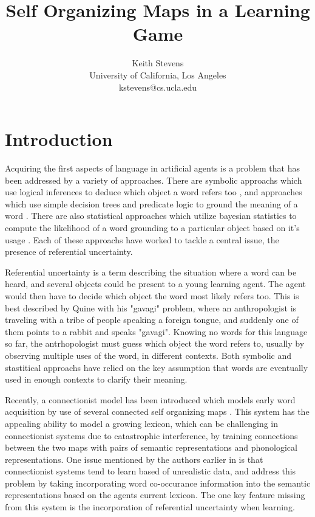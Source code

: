 \documentclass[a4paper,11pt]{article}
\title{Self Organizing Maps in a Learning Game}
\author{Keith Stevens \\ University of California, Los Angeles \\
kstevens@cs.ucla.edu}
\date{}
\begin{document}
\maketitle

\section{Introduction}
Acquiring the first aspects of language in artificial agents is a problem that
has been addressed by a variety of approaches.  There are symbolic approachs
which use logical inferences to deduce which object a word refers too
\cite{Siskind}, and approaches which use simple decision trees and predicate
logic to ground the meaning of a word \cite{GoldNico}.  There are also
statistical approaches which utilize bayesian statistics to compute the
likelihood of a word grounding to a particular object based on it's usage
\cite{FazlyProbRefUn,SmithCommSystem,VogtSocial}.  Each of these approachs have
worked to tackle a central issue, the presence of referential uncertainty.  

Referential uncertainty is a term describing the situation where a word can be
heard, and several objects could be present to a young learning agent.  The
agent would then have to decide which object the word most likely refers too.
This is best described by Quine \cite{Quine} with his "gavagi" problem, where an
anthropologist is traveling with a tribe of people speaking a foreign tongue,
and suddenly one of them points to a rabbit and speaks "gavagi".  Knowing no
words for this language so far, the antrhopologist must guess which object the
word refers to, usually by observing multiple uses of the word, in different
contexts.  Both symbolic and stastitical approachs have relied on the key
assumption that words are eventually used in enough contexts to clarify their
meaning.

Recently, a connectionist model has been introduced which models early word
acquisition by use of several connected self organizing maps
\cite{LiDevLex,MiikDisLex}.  This system has the appealing ability to model a
growing lexicon, which can be challenging in connectionist systems due to
catastrophic interference, by training connections between the two maps with
pairs of semantic representations and phonological representations.  One issue
mentioned by the authors earlier in \cite{FarkasWcd} is that connectionist
systems tend to learn based of unrealistic data, and address this problem by
taking incorporating word co-occurance information into the semantic
representations based on the agents current lexicon.  The one key feature
missing from this system is the incorporation of referential uncertainty when
learning.
\end{document}
